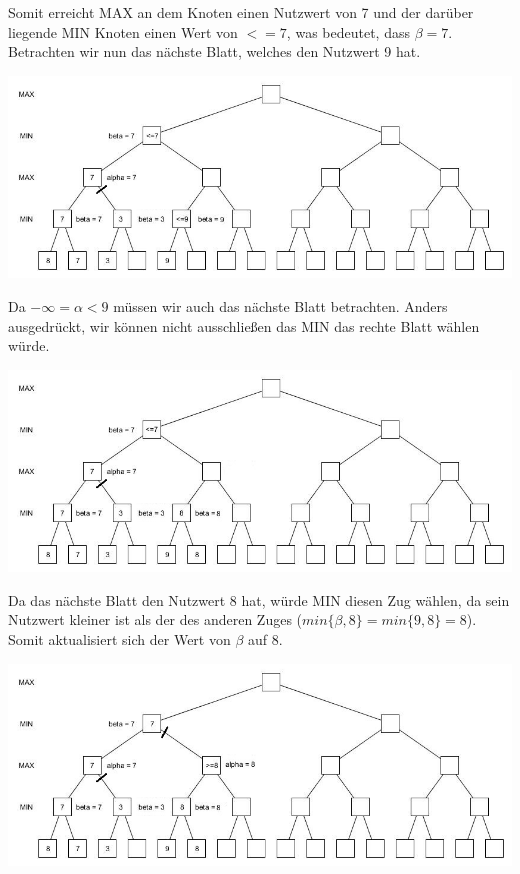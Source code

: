 Somit erreicht MAX an dem Knoten einen Nutzwert von 7 und der darüber liegende MIN Knoten einen Wert von $<=7$, was bedeutet, dass $\beta = 7$. Betrachten wir nun das nächste Blatt, welches den Nutzwert 9 hat.

\begin{center}
	\includegraphics[width = 12 cm]{chapters/minimax/jpg/Alpha-beta4.jpg}
\end{center}

 Da $-\infty = \alpha <9$ müssen wir auch das nächste Blatt betrachten. Anders ausgedrückt, wir können nicht ausschließen das MIN das rechte Blatt wählen würde.

 \begin{center}
 	\includegraphics[width = 12 cm]{chapters/minimax/jpg/Alpha-beta5.jpg}
 \end{center}

 Da das nächste Blatt den Nutzwert 8 hat, würde MIN diesen Zug wählen, da sein Nutzwert kleiner ist als der des anderen Zuges ($min\{\beta, 8\}= min\{9,8\}=8$). Somit aktualisiert sich der Wert von $\beta$ auf 8.

 \begin{center}
 	\includegraphics[width = 12 cm]{chapters/minimax/jpg/Alpha-beta6.jpg}
 \end{center}

